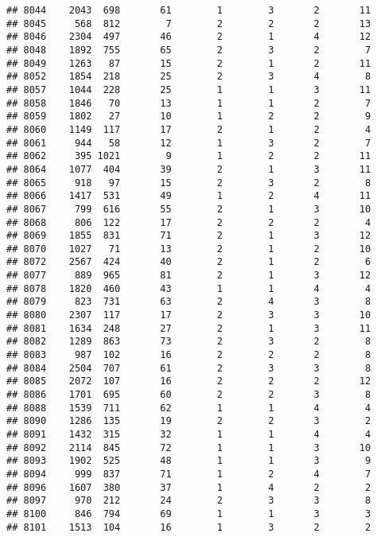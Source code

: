 \documentclass[]{article}
\begin{document}
\begin{verbatim}
## 8044    2043  698       61        1        3       2       11
## 8045     568  812        7        2        2       2       13
## 8046    2304  497       46        2        1       4       12
## 8048    1892  755       65        2        3       2        7
## 8049    1263   87       15        2        1       2       11
## 8052    1854  218       25        2        3       4        8
## 8057    1044  228       25        1        1       3       11
## 8058    1846   70       13        1        1       2        7
## 8059    1802   27       10        1        2       2        9
## 8060    1149  117       17        2        1       2        4
## 8061     944   58       12        1        3       2        7
## 8062     395 1021        9        1        2       2       11
## 8064    1077  404       39        2        1       3       11
## 8065     918   97       15        2        3       2        8
## 8066    1417  531       49        1        2       4       11
## 8067     799  616       55        2        1       3       10
## 8068     806  122       17        2        2       2        4
## 8069    1855  831       71        2        1       3       12
## 8070    1027   71       13        2        1       2       10
## 8072    2567  424       40        2        1       2        6
## 8077     889  965       81        2        1       3       12
## 8078    1820  460       43        1        1       4        4
## 8079     823  731       63        2        4       3        8
## 8080    2307  117       17        2        3       3       10
## 8081    1634  248       27        2        1       3       11
## 8082    1289  863       73        2        3       2        8
## 8083     987  102       16        2        2       2        8
## 8084    2504  707       61        2        3       3        8
## 8085    2072  107       16        2        2       2       12
## 8086    1701  695       60        2        2       3        8
## 8088    1539  711       62        1        1       4        4
## 8090    1286  135       19        2        2       3        2
## 8091    1432  315       32        1        1       4        4
## 8092    2114  845       72        1        1       3       10
## 8093    1902  525       48        1        1       3        9
## 8094     999  837       71        1        2       4        7
## 8096    1607  380       37        1        4       2        2
## 8097     970  212       24        2        3       3        8
## 8100     846  794       69        1        1       3        3
## 8101    1513  104       16        1        3       2        2

\end{verbatim}
\end{document}
